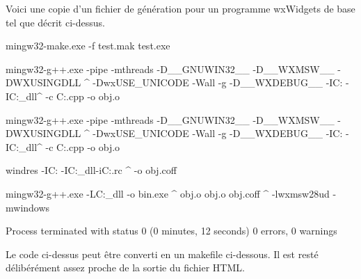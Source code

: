 Voici une copie d'un fichier de génération pour un programme wxWidgets de base tel que décrit ci-dessus.



\begin{code}

mingw32-make.exe -f test.mak test.exe

mingw32-g++.exe -pipe -mthreads -D__GNUWIN32__ -D__WXMSW__ -DWXUSINGDLL         ^
    -DwxUSE_UNICODE -Wall -g -D__WXDEBUG__ -IC:\PF{}
    -IC:\PF{}\contrib\PF{}\lib\gcc_dll\mswud ^ 
    -c C:\Development\test\testApp.cpp -o obj\Debug\testApp.o

mingw32-g++.exe -pipe -mthreads -D__GNUWIN32__ -D__WXMSW__ -DWXUSINGDLL         ^
    -DwxUSE_UNICODE -Wall -g -D__WXDEBUG__ -IC:\PF{}
    -IC:\PF{}\contrib\PF{}\lib\gcc_dll\mswud ^ 
    -c C:\Development\test\testMain.cpp -o obj\Debug\testMain.o

windres -IC:\PF{}\PF{}\contrib
    -IC:\PF{}\lib\gcc_dll\mswud -iC:\Development\test\resource.rc    ^ 
    -o obj\Debug\resource.coff

mingw32-g++.exe -LC:\PF{}\lib\gcc_dll -o bin\Debug\test.exe          ^
    obj\Debug\testApp.o obj\Debug\testMain.o obj\Debug\resource.coff            ^
    -lwxmsw28ud -mwindows

Process terminated with status 0 (0 minutes, 12 seconds)
0 errors, 0 warnings
\end{code}

Le code ci-dessus peut être converti en un makefile ci-dessous. Il est resté délibérément assez proche de la sortie du fichier HTML.


